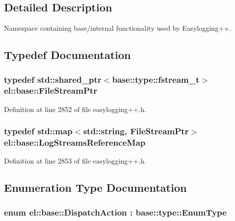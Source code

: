 \subsection{Detailed Description}
Namespace containing base/internal functionality used by Easylogging++. 

\subsection{Typedef Documentation}
\hypertarget{namespaceel_1_1base_a8b10bcfd674533f8340cd8c39fbf5233}{}
\subsubsection[{File\+Stream\+Ptr}]{\setlength{\rightskip}{0pt plus 5cm}typedef std\+::shared\+\_\+ptr$<${\bf base\+::type\+::fstream\+\_\+t}$>$ {\bf el\+::base\+::\+File\+Stream\+Ptr}}\label{namespaceel_1_1base_a8b10bcfd674533f8340cd8c39fbf5233}


Definition at line 2852 of file easylogging++.\+h.

\hypertarget{namespaceel_1_1base_af7602da9fe1d6c75985184fb0e39fd11}{}
\subsubsection[{Log\+Streams\+Reference\+Map}]{\setlength{\rightskip}{0pt plus 5cm}typedef std\+::map$<$std\+::string, {\bf File\+Stream\+Ptr}$>$ {\bf el\+::base\+::\+Log\+Streams\+Reference\+Map}}\label{namespaceel_1_1base_af7602da9fe1d6c75985184fb0e39fd11}


Definition at line 2853 of file easylogging++.\+h.



\subsection{Enumeration Type Documentation}
\hypertarget{namespaceel_1_1base_a3aa2563d38e47388ba242a1694fc2839}{}
\subsubsection[{Dispatch\+Action}]{\setlength{\rightskip}{0pt plus 5cm}enum {\bf el\+::base\+::\+Dispatch\+Action} \+: {\bf base\+::type\+::\+Enum\+Type}\hspace{0.3cm}{\ttfamily [strong]}}\label{namespaceel_1_1base_a3aa2563d38e47388ba242a1694fc2839}


